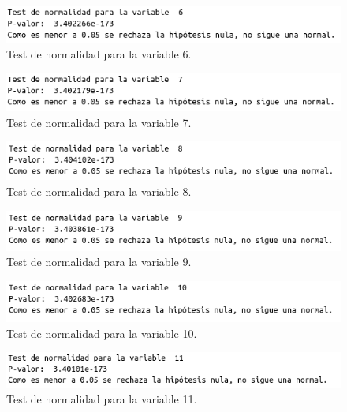\documentclass[12pt,a4paper]{article}
\begin{document}
\begin{figure}[H]
	\centering
	\includegraphics[scale=0.65]{./Imagenes/test_normalidad6.png}
	\caption{Test de normalidad para la variable 6.}
\end{figure}

\begin{figure}[H]
	\centering
	\includegraphics[scale=0.65]{./Imagenes/test_normalidad7.png}
	\caption{Test de normalidad para la variable 7.}
\end{figure}

\begin{figure}[H]
	\centering
	\includegraphics[scale=0.65]{./Imagenes/test_normalidad8.png}
	\caption{Test de normalidad para la variable 8.}
\end{figure}

\begin{figure}[H]
	\centering
	\includegraphics[scale=0.65]{./Imagenes/test_normalidad9.png}
	\caption{Test de normalidad para la variable 9.}
\end{figure}

\begin{figure}[H]
	\centering
	\includegraphics[scale=0.65]{./Imagenes/test_normalidad10.png}
	\caption{Test de normalidad para la variable 10.}
\end{figure}

\begin{figure}[H]
	\centering
	\includegraphics[scale=0.65]{./Imagenes/test_normalidad11.png}
	\caption{Test de normalidad para la variable 11.}
\end{figure}
\end{document}
